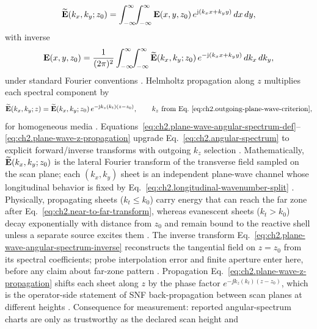 \begin{equation}
\label{eq:ch2.plane-wave-angular-spectrum-def}
\widetilde{\mathbf{E}}(k_x,k_y;z_0)
=
\int_{-\infty}^{\infty}\!\!\int_{-\infty}^{\infty}
\mathbf{E}(x,y,z_0)\,
e^{\mathrm{j}(k_x x+k_y y)}\,dx\,dy,
\end{equation}
with inverse
\begin{equation}
\label{eq:ch2.plane-wave-angular-spectrum-inverse}
\mathbf{E}(x,y,z_0)
=
\frac{1}{(2\pi)^{2}}
\int_{-\infty}^{\infty}\!\!\int_{-\infty}^{\infty}
\widetilde{\mathbf{E}}(k_x,k_y;z_0)\,
e^{-\mathrm{j}(k_x x+k_y y)}\,dk_x\,dk_y,
\end{equation}
under standard Fourier conventions \cite{stratton1941}. Helmholtz propagation along
\(z\) multiplies each spectral component by
\begin{equation}
\label{eq:ch2.plane-wave-z-propagation}
\widetilde{\mathbf{E}}(k_x,k_y;z)
=
\widetilde{\mathbf{E}}(k_x,k_y;z_0)\,
e^{-\mathrm{j} k_z(k_t)(z-z_0)},
\qquad
k_z\ \text{from Eq.~\eqref{eq:ch2.outgoing-plane-wave-criterion}},
\end{equation}
for homogeneous media \cite{stratton1941}. Equations~\eqref{eq:ch2.plane-wave-angular-spectrum-def}--\eqref{eq:ch2.plane-wave-z-propagation}
upgrade Eq.~\eqref{eq:ch2.angular-spectrum} to explicit forward/inverse
transforms with outgoing \(k_z\) selection \cite{stratton1941}. Mathematically,
\(\widetilde{\mathbf{E}}(k_x,k_y;z_0)\) is the lateral Fourier transform of the transverse field sampled
on the scan plane; each \((k_x,k_y)\) sheet is an independent plane-wave channel whose
longitudinal behavior is fixed by Eq.~\eqref{eq:ch2.longitudinal-wavenumber-split}
\cite{stratton1941}. Physically, propagating sheets (\(k_t\le k_0\)) carry energy that can reach
the far zone after Eq.~\eqref{eq:ch2.near-to-far-transform}, whereas evanescent sheets
(\(k_t>k_0\)) decay exponentially with distance from \(z_0\) and remain bound to the reactive
shell unless a separate source excites them \cite{harrington2001}. The inverse transform
Eq.~\eqref{eq:ch2.plane-wave-angular-spectrum-inverse} reconstructs the tangential field on
\(z=z_0\) from its spectral coefficients; probe interpolation error and finite aperture enter
here, before any claim about far-zone pattern \cite{hansen1988}. Propagation
Eq.~\eqref{eq:ch2.plane-wave-z-propagation} shifts each sheet along \(z\) by the phase factor
\(e^{-\jj k_z(k_t)(z-z_0)}\), which is the operator-side statement of SNF back-propagation
between scan planes at different heights \cite{jackson1999}. Consequence for measurement:
reported angular-spectrum charts are only as trustworthy as the declared scan height and
